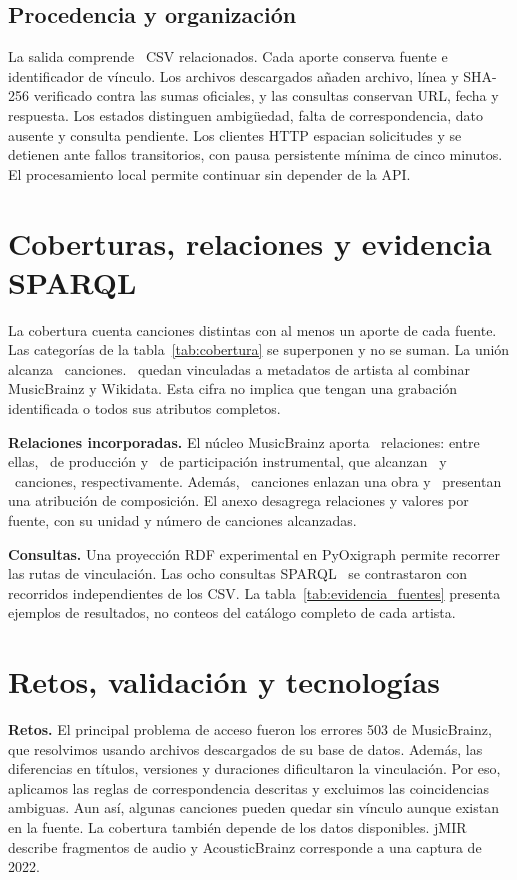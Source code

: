 \documentclass[11pt,a4paper]{article}
\begin{document}
\subsection{Procedencia y organización}
La salida comprende \NumeroTablas\ CSV relacionados. Cada aporte conserva fuente e identificador de vínculo. Los archivos descargados añaden archivo, línea y SHA-256 verificado contra las sumas oficiales, y las consultas conservan URL, fecha y respuesta. Los estados distinguen ambigüedad, falta de correspondencia, dato ausente y consulta pendiente. Los clientes HTTP espacian solicitudes y se detienen ante fallos transitorios, con pausa persistente mínima de cinco minutos. El procesamiento local permite continuar sin depender de la API.

\section{Coberturas, relaciones y evidencia SPARQL}
La cobertura cuenta canciones distintas con al menos un aporte de cada fuente. Las categorías de la tabla~\ref{tab:cobertura} se superponen y no se suman. La unión alcanza \TotalEnriquecidas\ canciones. \CancionesContextoArtista\ quedan vinculadas a metadatos de artista al combinar MusicBrainz y Wikidata. Esta cifra no implica que tengan una grabación identificada o todos sus atributos completos.


\textbf{Relaciones incorporadas.} El núcleo MusicBrainz aporta \RelacionesMusicales\ relaciones: entre ellas, \RelacionesProductor\ de producción y \RelacionesInstrumento\ de participación instrumental, que alcanzan \CancionesProductor\ y \CancionesInstrumento\ canciones, respectivamente. Además, \CancionesObra\ canciones enlazan una obra y \CancionesCompositor\ presentan una atribución de composición. El anexo desagrega relaciones y valores por fuente, con su unidad y número de canciones alcanzadas.

\textbf{Consultas.} Una proyección RDF experimental en PyOxigraph permite recorrer las rutas de vinculación. Las ocho consultas SPARQL~\cite{sparql} se contrastaron con recorridos independientes de los CSV. La tabla~\ref{tab:evidencia_fuentes} presenta ejemplos de resultados, no conteos del catálogo completo de cada artista.


\newpage
\section{Retos, validación y tecnologías}
\textbf{Retos.} El principal problema de acceso fueron los errores 503 de MusicBrainz, que resolvimos usando archivos descargados de su base de datos. Además, las diferencias en títulos, versiones y duraciones dificultaron la vinculación. Por eso, aplicamos las reglas de correspondencia descritas y excluimos las coincidencias ambiguas. Aun así, algunas canciones pueden quedar sin vínculo aunque existan en la fuente. La cobertura también depende de los datos disponibles. jMIR describe fragmentos de audio y AcousticBrainz corresponde a una captura de 2022.
\end{document}
